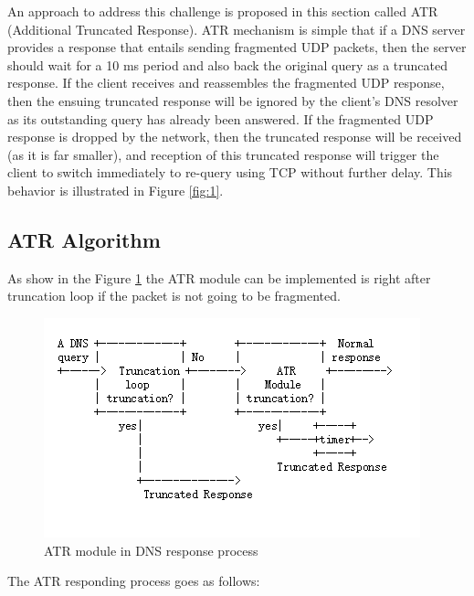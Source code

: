 An approach to address this challenge is proposed in this section 
called ATR (Additional Truncated Response). ATR mechanism is simple 
that if a DNS server provides a response that entails sending 
fragmented UDP packets, then the server should wait for a 10 ms 
period and also back the original query as a truncated response. 
If the client receives and reassembles the fragmented UDP response, 
then the ensuing truncated response will be ignored by the client’s 
DNS resolver as its outstanding query has already been answered. 
If the fragmented UDP response is dropped by the network, then the 
truncated response will be received (as it is far smaller), and 
reception of this truncated response will trigger the client to 
switch immediately to re-query using TCP without further delay. 
This behavior is illustrated in Figure \ref{fig:1}.

\subsection{ATR Algorithm}

As show in the Figure \ref{fig:2} the ATR module can be implemented is right after truncation loop if the packet is not going to be fragmented.

\begin{figure}[tp]
\centering
\includegraphics[width=\linewidth]{figures/ATR_Algorithm.png}
\caption{ATR module in DNS response process}\label{fig:2}
\end{figure}

The ATR responding process goes as follows:

